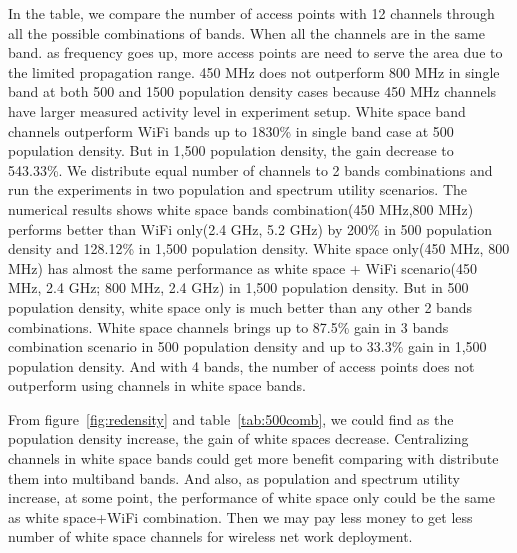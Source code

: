 In the table, we compare the number of access points with 12 channels through all 
the possible combinations of bands. 
When all the channels are in the same band. as frequency goes up, more access 
points are need to serve the area due to the limited propagation range. 
450 MHz does not outperform 800 MHz in single band at both 500 and 1500 population
density cases because 450 MHz channels have larger measured activity level in experiment setup. 
White space band channels outperform WiFi bands up to 1830\% in single band case
at 500 population density. But in 1,500 population density, the gain decrease to 543.33\%.
We distribute equal number of channels to 2 bands combinations and run the experiments in 
two population and spectrum utility scenarios. The numerical results shows white space bands 
combination(450 MHz,800 MHz) performs better than WiFi only(2.4 GHz, 5.2 GHz) by 200\% in 
500 population density and 128.12\% in 1,500 population density. 
White space only(450 MHz, 800 MHz) has almost the same performance as white space + WiFi 
scenario(450 MHz, 2.4 GHz; 800 MHz, 2.4 GHz) in 1,500 population density. But in 500 population
density, white space only is much better than any other 2 bands combinations.
White space channels brings up to 87.5\% gain in 3 bands combination scenario in 500 population
density and up to 33.3\% gain in 1,500 population density. And with 4 bands, the number of 
access points does not outperform using channels in white space bands.

From figure~\ref{fig:redensity} and table~\ref{tab:500comb}, we could find as the population
density increase, the gain of white spaces decrease. Centralizing channels in white space
bands could get more benefit comparing with distribute them into multiband bands.
And also, as population and spectrum utility increase, at some point, the performance of
white space only could be the same as white space+WiFi combination. Then we may pay
less money to get less number of white space channels for wireless net work deployment.

